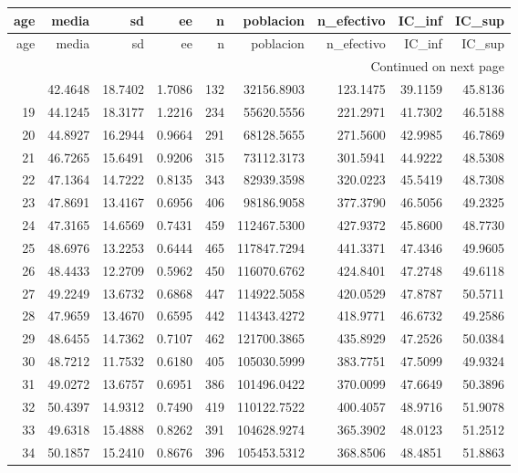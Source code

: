 \begin{longtable}{rrrrrrrrr}
\toprule
age & media & sd & ee & n & poblacion & n\_efectivo & IC\_inf & IC\_sup \\
\midrule
\endfirsthead
\toprule
age & media & sd & ee & n & poblacion & n\_efectivo & IC\_inf & IC\_sup \\
\midrule
\endhead
\midrule
\multicolumn{9}{r}{Continued on next page} \\
\midrule
\endfoot
\bottomrule
\endlastfoot
18 & 42.4648 & 18.7402 & 1.7086 & 132 & 32156.8903 & 123.1475 & 39.1159 & 45.8136 \\
19 & 44.1245 & 18.3177 & 1.2216 & 234 & 55620.5556 & 221.2971 & 41.7302 & 46.5188 \\
20 & 44.8927 & 16.2944 & 0.9664 & 291 & 68128.5655 & 271.5600 & 42.9985 & 46.7869 \\
21 & 46.7265 & 15.6491 & 0.9206 & 315 & 73112.3173 & 301.5941 & 44.9222 & 48.5308 \\
22 & 47.1364 & 14.7222 & 0.8135 & 343 & 82939.3598 & 320.0223 & 45.5419 & 48.7308 \\
23 & 47.8691 & 13.4167 & 0.6956 & 406 & 98186.9058 & 377.3790 & 46.5056 & 49.2325 \\
24 & 47.3165 & 14.6569 & 0.7431 & 459 & 112467.5300 & 427.9372 & 45.8600 & 48.7730 \\
25 & 48.6976 & 13.2253 & 0.6444 & 465 & 117847.7294 & 441.3371 & 47.4346 & 49.9605 \\
26 & 48.4433 & 12.2709 & 0.5962 & 450 & 116070.6762 & 424.8401 & 47.2748 & 49.6118 \\
27 & 49.2249 & 13.6732 & 0.6868 & 447 & 114922.5058 & 420.0529 & 47.8787 & 50.5711 \\
28 & 47.9659 & 13.4670 & 0.6595 & 442 & 114343.4272 & 418.9771 & 46.6732 & 49.2586 \\
29 & 48.6455 & 14.7362 & 0.7107 & 462 & 121700.3865 & 435.8929 & 47.2526 & 50.0384 \\
30 & 48.7212 & 11.7532 & 0.6180 & 405 & 105030.5999 & 383.7751 & 47.5099 & 49.9324 \\
31 & 49.0272 & 13.6757 & 0.6951 & 386 & 101496.0422 & 370.0099 & 47.6649 & 50.3896 \\
32 & 50.4397 & 14.9312 & 0.7490 & 419 & 110122.7522 & 400.4057 & 48.9716 & 51.9078 \\
33 & 49.6318 & 15.4888 & 0.8262 & 391 & 104628.9274 & 365.3902 & 48.0123 & 51.2512 \\
34 & 50.1857 & 15.2410 & 0.8676 & 396 & 105453.5312 & 368.8506 & 48.4851 & 51.8863 \\

\end{longtable}
